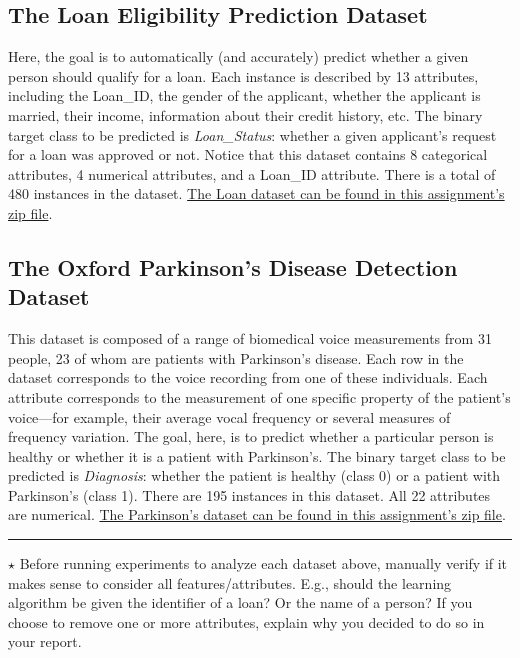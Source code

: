 \documentclass[letterpaper]{article}
\begin{document}
\subsection{The Loan Eligibility Prediction Dataset}

Here, the goal is to automatically (and accurately) predict whether a given person should qualify for a loan. Each instance is described by 13 attributes, including the Loan\_ID, the gender of the applicant, whether the applicant is married, their income, information about their credit history, etc. The binary target class to be predicted is \textit{Loan\_Status}: whether a given applicant's request for a loan was approved or not. Notice that this dataset contains 8 categorical attributes, 4 numerical attributes, and a Loan\_ID attribute. There is a total of 480 instances in the dataset. \href{https://people.cs.umass.edu/~bsilva/courses/CMPSCI_589/Spring2024/homeworks/final_project.zip}{The Loan dataset can be found in this assignment's zip file}.



\subsection{The Oxford Parkinson's Disease Detection Dataset}

This dataset is composed of a range of biomedical voice measurements from 31 people, 23 of whom are patients with Parkinson's disease. Each row in the dataset corresponds to the voice recording from one of these individuals. Each attribute corresponds to the measurement of one specific property of the patient's voice---for example, their average vocal frequency or several measures of frequency variation. The goal, here, is to predict whether a particular person is healthy or whether it is a patient with Parkinson's. The binary target class to be predicted is \textit{Diagnosis}: whether the patient is healthy (class 0) or a patient with Parkinson's (class 1). There are 195 instances in this dataset. All 22 attributes are numerical. \href{https://people.cs.umass.edu/~bsilva/courses/CMPSCI_589/Spring2024/homeworks/final_project.zip}{The Parkinson's dataset can be found in this assignment's zip file}.


\vspace{1cm}
\noindent\rule{\textwidth}{1pt}
$\star$ Before running experiments to analyze each dataset above, manually verify if it makes sense to consider all features/attributes. E.g., should the learning algorithm be given the identifier of a loan? Or the name of a person? If you choose to remove one or more attributes, explain why you decided to do so in your report.
\end{document}

